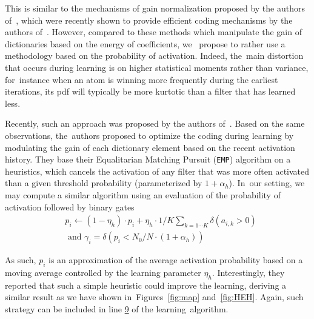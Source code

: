 \documentclass[vision,article,accept,oneauthor,pdftex]{Definitions/mdpi}
\begin{document}
This is similar to the mechanisms of gain normalization proposed by the authors of~\cite{Schwartz01}, which were recently shown to provide efficient coding mechanisms by the authors of~\cite{Simoncelli01}. However, compared to these methods which manipulate the gain of dictionaries based on the energy of coefficients, we~ propose to rather use a methodology based on the probability of activation. Indeed, the~main distortion that occurs during learning is on higher statistical moments rather than variance, for~instance when an atom is winning more frequently during the earliest iterations, its pdf will typically be more kurtotic than a filter that has learned less.

Recently, such an approach was proposed by the authors of~\cite{Sandin17}. Based on the same observations, the~authors proposed to optimize the coding during learning by modulating the gain of each dictionary element based on the recent activation history. They base their Equalitarian Matching Pursuit (\texttt{EMP}) algorithm on a heuristics, which cancels the activation of any filter that was more often activated than a given threshold probability (parameterized by $1+\alpha_h$). In~our setting, we may compute a similar algorithm using an evaluation of the probability of activation followed by binary gates
\begin{align}%
&p_i \leftarrow (1- \eta_h ) \cdot p_i + \eta_h \cdot 1/K\sum_{k=1\cdots K} \delta(a_{i, k} > 0) \\ &\textrm{ and }
\gamma_i = \delta (p_i < N_0/N \cdot (1+\alpha_h) )
\end{align}%

As such, $p_i$ is an approximation of the average activation probability based on a moving average controlled by the learning parameter $\eta_h$.
Interestingly, they reported that such a simple heuristic could improve the learning, deriving a similar result as we have shown in~Figures~\ref{fig:map} and~\ref{fig:HEH}. %
Again, such~ strategy can be included in line \hyperlink{here2}{9} of the learning~algorithm.
\end{document}
